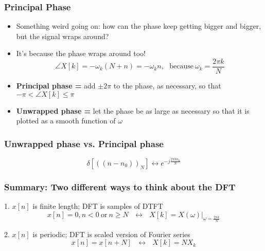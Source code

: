 \documentclass{beamer}
\begin{document}
\begin{frame}
  \frametitle{Principal Phase}

  \begin{itemize}
  \item Something weird going on: how can the phase keep getting
    bigger and bigger, but the signal wraps around?
  \item It's because the phase wraps around too!
    \begin{displaymath}
      \angle X[k] = -\omega_k (N+n) = -\omega_k n,~~~\mbox{because}~\omega_k=\frac{2\pi k}{N}
    \end{displaymath}
  \item {\bf Principal phase =} add $\pm 2\pi$ to the phase, as
    necessary, so that $-\pi< \angle X[k]\le \pi$
  \item {\bf Unwrapped phase = } let the phase be as large as
    necessary so that it is plotted as a smooth function of $\omega$
  \end{itemize}
\end{frame}

\begin{frame}
  \frametitle{Unwrapped phase vs. Principal phase}

  \begin{displaymath}
    \delta\left[(\!(n-n_0)\!)_N\right] \leftrightarrow e^{-j\frac{2\pi kn_0}{N}}
  \end{displaymath}
  
  \centerline{}

\end{frame}

\begin{frame}
  \frametitle{Summary: Two different ways to think about the DFT}
  \begin{block}{1. $x[n]$ is finite length; DFT is samples of DTFT}
    \begin{displaymath}
      x[n]=0,n<0~\text{or}~n\ge N~~~\leftrightarrow~~~X[k]=\left.X(\omega)\right|_{\omega=\frac{2\pi k}{N}}
    \end{displaymath}
  \end{block}
  \begin{block}{2. $x[n]$ is periodic; DFT is scaled version of Fourier series}
    \begin{displaymath}
      x[n]=x[n+N]~~~\leftrightarrow~~~X[k]=N X_k
    \end{displaymath}
  \end{block}
\end{frame}
\end{document}
